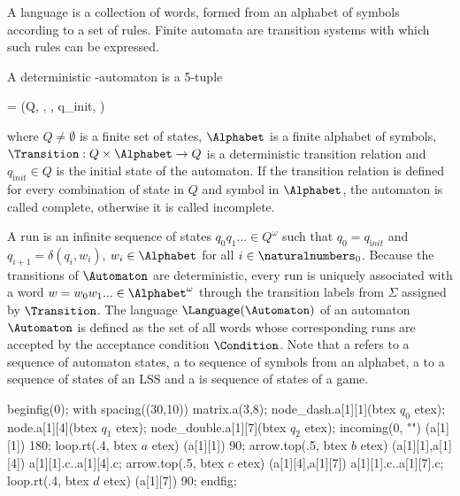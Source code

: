 A language is a collection of words, formed from an alphabet of symbols according to a set of rules.
Finite automata are transition systems with which such rules can be expressed.


\startsubsection[title={\omega-Automata},reference=sec:theory-automata-omega]

    A deterministic \omega-automaton is a 5-tuple 

    \startformula
        \Automaton = (Q, \Alphabet, \Transition, q_{\mathrm init}, \Condition) \EndComma
    \stopformula

    where
    $Q \neq \emptyset$ is a finite set of states,
    $\Alphabet$ is a finite alphabet of symbols,
    $\Transition: Q \times \Alphabet \rightarrow Q$ is a deterministic transition relation and
    $q_{\mathrm init} \in Q$ is the initial state of the automaton.
    If the transition relation is defined for every combination of state in $Q$ and symbol in $\Alphabet$, the automaton is called complete, otherwise it is called incomplete.

    A run is an infinite sequence of states $q_0 q_1 ... \in Q^\omega$ such that $q_0 = q_{\mathrm init}$ and $q_{i+1} = \delta(q_i, w_i)$, $w_i \in \Alphabet$ for all $i \in \naturalnumbers_0$.
    Because the transitions of $\Automaton$ are deterministic, every run is uniquely associated with a word $w = w_0 w_1 ... \in \Alphabet^\omega$ through the transition labels from $\Sigma$ assigned by $\Transition$.
    The language $\Language(\Automaton)$ of an automaton $\Automaton$ is defined as the set of all words whose corresponding runs are accepted by the acceptance condition $\Condition$.
    Note that a  refers to a sequence of automaton states, a  to sequence of symbols from an alphabet, a  to a sequence of states of an LSS and a  is sequence of states of a game.

\stopsubsection


    beginfig(0);
        with spacing((30,10)) matrix.a(3,8);
        node_dash.a[1][1](btex $q_0$ etex);
        node.a[1][4](btex $q_1$ etex);
        node_double.a[1][7](btex $q_2$ etex);
        incoming(0, "") (a[1][1]) 180;
        loop.rt(.4, btex \;$a$ etex) (a[1][1]) 90;
        arrow.top(.5, btex $b$ etex) (a[1][1],a[1][4]) a[1][1].c..a[1][4].c;
        arrow.top(.5, btex $c$ etex) (a[1][4],a[1][7]) a[1][1].c..a[1][7].c;
        loop.rt(.4, btex \;$d$ etex) (a[1][7]) 90;
    endfig;
\stopreusableMPgraphic

